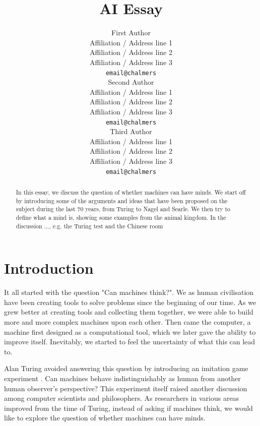 \documentclass[11pt]{article}
\title{AI Essay}
\author{First Author \\
  Affiliation / Address line 1 \\
  Affiliation / Address line 2 \\
  Affiliation / Address line 3 \\
  {\tt email@chalmers} \\\And
  Second Author \\
  Affiliation / Address line 1 \\
  Affiliation / Address line 2 \\
  Affiliation / Address line 3 \\
  {\tt email@chalmers} \\\And
  Third Author \\
  Affiliation / Address line 1 \\
  Affiliation / Address line 2 \\
  Affiliation / Address line 3 \\
  {\tt email@chalmers} \\}
\date{}
\newcommand{\sk}[1]{{\color{dark-green-2} #1}}
\newcommand{\dr}[1]{{\color{dark-cornflower-blue-2} #1}}
\newenvironment{sketch}{\color{dark-green-2}}{\ignorespacesafterend}
\newenvironment{draft}{\color{dark-cornflower-blue-2}}{\ignorespacesafterend}
\begin{document}

\maketitle
\begin{abstract}
\sk{
In this essay, we discuss the question of whether machines can have minds. We start off by introducing some of the arguments and ideas that have been proposed on the subject during the last 70 years, from Turing to Nagel and Searle. We then try to define what a mind is, showing some examples from the animal kingdom. In the discussion ..., e.g. the Turing test and the Chinese room \todo{Bjorn, finish this}
}
\end{abstract}

\section{Introduction}
\label{sec:introduction}

It all started with the question "Can machines think?". We as human civilisation have been creating tools to solve problems since the beginning of our time. As we grew better at creating tools and collecting them together, we were able to build more and more complex machines upon each other. Then came the computer, a machine first designed as a computational tool, which we later gave the ability to improve itself. Inevitably, we started to feel the uncertainty of what this can lead to.

Alan Turing avoided answering this question by introducing an imitation game experiment \cite{turing1950computing}. Can machines behave indistinguishably as human from another human observer's perspective? This experiment itself raised another discussion among computer scientists and philosophers. As researchers in various areas improved from the time of Turing, instead of asking if machines think, we would like to explore the question of whether machines can have minds.


%
%
%
\end{document}
